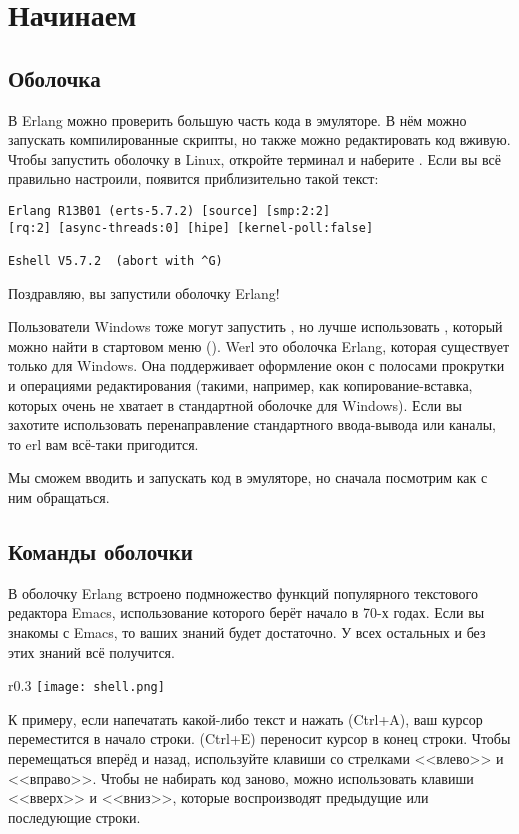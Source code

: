 \chapter{Начинаем}
\section{Оболочка}
В Erlang можно проверить большую часть кода в эмуляторе. В нём можно запускать компилированные скрипты, но также можно редактировать код вживую. Чтобы запустить оболочку в Linux, откройте терминал и наберите . Если вы всё правильно настроили, появится приблизительно такой текст: 
\begin{lstlisting}[style=repl]
Erlang R13B01 (erts-5.7.2) [source] [smp:2:2] 
[rq:2] [async-threads:0] [hipe] [kernel-poll:false] 
 
Eshell V5.7.2  (abort with ^G) 
\end{lstlisting}

Поздравляю, вы запустили оболочку Erlang! 

Пользователи Windows тоже могут запустить , но лучше использовать , который можно найти в стартовом меню (). Werl это оболочка Erlang, которая существует только для Windows. Она поддерживает оформление окон с полосами прокрутки и операциями редактирования (такими, например, как копирование\--вставка, которых очень не хватает в стандартной оболочке  для Windows). Если вы захотите использовать перенаправление стандартного ввода\--вывода или каналы, то erl вам всё\--таки пригодится. 

Мы сможем вводить и запускать код в эмуляторе, но сначала посмотрим как с ним обращаться.
\section{Команды оболочки}
В оболочку Erlang встроено подмножество функций популярного текстового редактора Emacs, использование которого берёт начало в 70\--х годах. Если вы знакомы с Emacs, то ваших знаний будет достаточно. У всех остальных и без этих знаний всё получится.

\begin{wrapfigure}{r}{0.3\linewidth}
    \texttt{[image: shell.png]}
\end{wrapfigure}
К примеру, если напечатать какой\--либо текст и нажать (Ctrl+A), ваш курсор переместится в начало строки. (Ctrl+E) переносит курсор в конец строки. Чтобы перемещаться вперёд и назад, используйте клавиши со стрелками <<влево>> и <<вправо>>. Чтобы не набирать код заново, можно использовать клавиши <<вверх>> и <<вниз>>, которые воспроизводят предыдущие или последующие строки.

